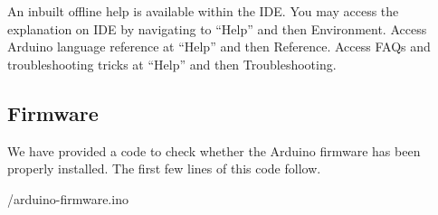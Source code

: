 An inbuilt offline help is available within the IDE. You may access
the explanation on IDE by navigating to ``Help'' and then
Environment. Access Arduino language reference at ``Help'' and then
Reference. Access FAQs and troubleshooting tricks at ``Help'' and then
Troubleshooting.

\subsection{Firmware}
We have provided a code to check whether the Arduino firmware has been
properly installed.  The first few lines of this code follow. 

\begin{ardcode}
      \label{ard:firmware}
      
      {\LocSWfirmcode/arduino-firmware.ino}
\end{ardcode}



